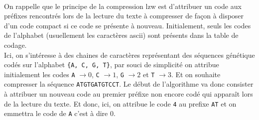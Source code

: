 \documentclass[11pt,a4paper]{article}
\begin{document}
\begin{Exercise}[title = Séquence génétique]\\
    On rappelle que le principe de la compression {\sc lzw} est d'attribuer un code aux préfixes rencontrés lors de la lecture du texte à compresser de façon à disposer d'un code compact si ce code se présente à nouveau. Initialement, seuls les codes de l'alphabet (usuellement les caractères {\sc ascii}) sont présents dans la table de codage. \\
    Ici, on s'intéresse à des chaines de caractères représentant des séquences génétique codés sur l'alphabet {\tt \{A, C, G, T\}}, par souci de simplicité on attribue initialement les codes {\tt A} $\rightarrow 0$, {\tt C} $\rightarrow 1$, {\tt G} $\rightarrow 2$  et {\tt T} $\rightarrow 3$. Et on souhaite compresser la séquence {\tt ATGTGATGTCCT}.
    Le début de l'algorithme va donc consister à attribuer un nouveau code au premier préfixe non encore codé qui apparaît lors de la lecture du texte. Et donc, ici, on attribue le code {\tt 4} au prefixe {\tt AT} et on emmettra le code de {\tt A} c'est à dire 0.
\end{Exercise}
\end{document}
